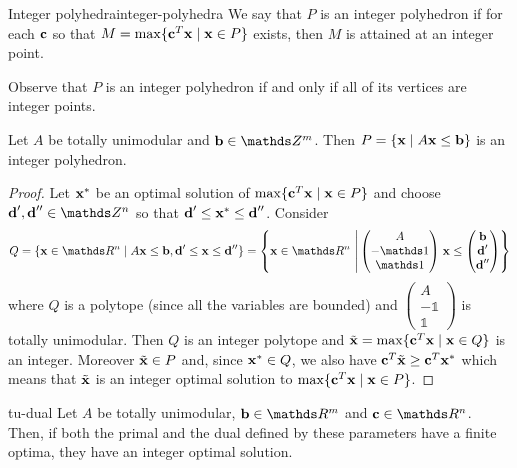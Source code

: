 \documentclass[12pt]{extarticle}
\renewcommand{\vec}[1]{\bvec{#1}}
\begin{document}
\begin{definition}{Integer polyhedra}{integer-polyhedra}
	We say that $P$ is an integer polyhedron if for each $\vec c$ so that
	$M = \max\{\vec c^T \vec x \mid \vec x \in P\}$ exists, then $M$ is attained at an integer point.
\end{definition}

Observe that $P$ is an integer polyhedron if and only if all of its vertices are integer points.

\begin{corollary}{}{}
	Let $A$ be totally unimodular and $\vec b \in \Z^m$. Then
	$P = \{ \vec x \mid A \vec x \leq \vec b \}$ is an integer polyhedron.
\end{corollary}

\begin{proof}
	Let $\vec x^*$ be an optimal solution of $\max \{ \vec c^T \vec x \mid \vec x \in P \}$ and choose
	$\vec d', \vec d'' \in \Z^n$ so that $\vec d' \leq \vec x^* \leq \vec d''$.
	Consider
	\begin{equation}
		Q = \{ \vec x \in \R^n \mid A \vec x \leq \vec b, \vec d' \leq \vec x \leq \vec d''\}
		= \left\{ \vec x \in \R^n \, \left| \, \begin{pmatrix} A \\ - \mathds 1 \\ \mathds 1
		\end{pmatrix} \right.
		\vec x \leq \begin{pmatrix} \vec b \\ \vec d' \\ \vec d''\end{pmatrix} \right\}
	\end{equation}
	where $Q$ is a polytope (since all the variables are bounded) and
	$\begin{pmatrix} A \\ - \mathds 1 \\ \mathds 1 \end{pmatrix}$ is totally unimodular.
	Then $Q$ is an integer polytope and $\tilde{\vec x} = \max \{\vec c^T \vec x \mid \vec x \in Q\}$
	is an integer.
	Moreover $\tilde{\vec x} \in P$ and, since $\vec x^* \in Q$, we also have
	$\vec c^T \tilde{\vec x} \geq \vec c^T \vec x^*$ which means that $\tilde{\vec x}$ is an integer
	optimal solution to $\max \{\vec c^T \vec x \mid \vec x \in P \}$.
\end{proof}

\begin{corollary}{}{tu-dual}
	Let $A$ be totally unimodular, $\vec b \in \R^m$ and $\vec c \in \R^n$. Then, if both the primal
	and the dual defined by these parameters have a finite optima, they have an integer optimal
	solution.
\end{corollary}
\end{document}
